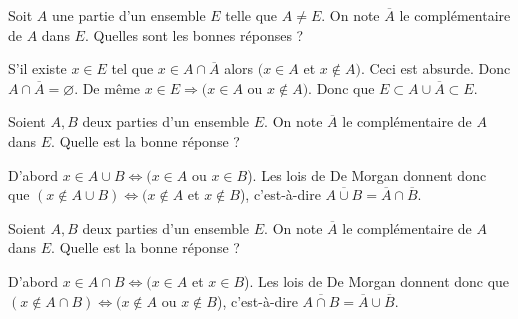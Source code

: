 \begin{question}
Soit $A$ une partie d'un ensemble $E$ telle que $A\neq E$. On note $\overline{A}$ le complémentaire de $A$ dans $E$. Quelles sont les bonnes réponses ?
\begin{answers}  
\end{answers}
\begin{explanations}
S'il existe $x\in E$ tel que $x\in A\cap \overline{A}$ alors $(x\in A$ et $x\notin A)$. Ceci est absurde. Donc $A\cap \overline{A}=\varnothing$. De même $x\in E\Rightarrow (x\in A$ ou $x\notin A)$. Donc que $E\subset A\cup\overline{A}\subset E$.
\end{explanations}
\end{question}


\begin{question}
Soient $A,B$ deux parties d'un ensemble $E$. On note $\overline{A}$ le complémentaire de $A$ dans $E$. Quelle est la bonne réponse ?
\begin{answers}  
\end{answers}
\begin{explanations}
D'abord $x\in A\cup B \Leftrightarrow (x\in A$ ou $x\in B$). Les lois de De Morgan donnent donc que $(x\notin A\cup B)\Leftrightarrow (x\notin A$ et $x\notin B$), c'est-à-dire $\overline{A\cup B}=\overline{A}\cap \overline{B}$.
\end{explanations}
\end{question}


\begin{question}
Soient $A,B$ deux parties d'un ensemble $E$. On note $\overline{A}$ le complémentaire de $A$ dans $E$. Quelle est la bonne réponse ?
\begin{answers}  
\end{answers}
\begin{explanations}
D'abord $x\in A\cap B \Leftrightarrow (x\in A$ et $x\in B$). Les lois de De Morgan donnent donc que $(x\notin A\cap B)\Leftrightarrow (x\notin A$ ou $x\notin B$), c'est-à-dire $\overline{A\cap B}=\overline{A}\cup \overline{B}$.
\end{explanations}
\end{question}


